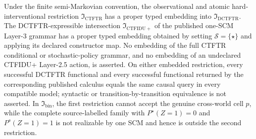 Under the finite semi-Markovian convention, the observational and atomic hard-interventional restriction \(\mathfrak I_{\mathrm{CTFTR}}\) has a proper typed embedding into \(\mathfrak I_{\mathrm{DCTFTR}}\). The DCTFTR-expressible intersection \(\mathfrak I_{\mathrm{CTFIDU+}}\) of the published one-SCM Layer-3 grammar has a proper typed embedding obtained by setting \(\mathcal S=\{\star\}\) and applying its declared constructor map. No embedding of the full CTFTR conditional or stochastic-policy grammar, and no embedding of an undeclared CTFIDU+ Layer-2.5 action, is asserted. On either embedded restriction, every successful DCTFTR functional and every successful functional returned by the corresponding published calculus equals the same causal query in every compatible model; syntactic or transition-by-transition equivalence is not asserted. In \(\mathfrak I_{\mathrm{bin}}\), the first restriction cannot accept the genuine cross-world cell \(p\), while the complete source-labelled family with \(P^\star(Z=1)=0\) and \(P^s(Z=1)=1\) is not realizable by one SCM and hence is outside the second restriction.
